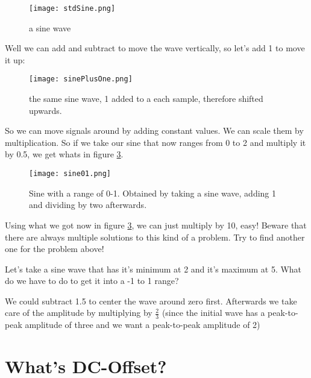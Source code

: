 \begin{figure}[h!]
	\centering
	\texttt{[image: stdSine.png]}
	\caption[a sine wave]
	{a sine wave}
	\label{fig:aSine}
\end{figure}
Well we can add and subtract to move the wave vertically, so let's add 1 to move it up:

\begin{figure}[h!]
	\centering
	\texttt{[image: sinePlusOne.png]}
	\caption[a sine wave]
	{the same sine wave, 1 added to a each sample, therefore shifted upwards.}
	\label{fig:aShiftedSine}
\end{figure}

So we can move signals around by adding constant values. We can scale them by multiplication. So if we take our sine that now ranges from 0 to 2 and multiply it by 0.5, we get whats in figure \ref{fig:sine01}.

\begin{figure}[h!]
 	\centering
 	\texttt{[image: sine01.png]}
 	\caption[sine 0 to 1]
 	{Sine with a range of 0-1. Obtained by taking a sine wave, adding 1 and dividing by two afterwards.}
 	\label{fig:sine01}
 \end{figure}

Using what we got now in figure \ref{fig:sine01}, we can just multiply by 10, easy! Beware that there are always multiple solutions to this kind of a problem. Try to find another one for the problem above!

\begin{question}
Let's take a sine wave that has it's minimum at 2 and it's maximum at 5. What do we have to do to get it into a -1 to 1 range?
\end{question}
\begin{Answer}
We could subtract 1.5 to center the wave around zero first. Afterwards we take care of the amplitude by multiplying by $\frac{2}{3}$ (since the initial wave has a peak-to-peak amplitude of three and we want a peak-to-peak amplitude of 2)
\end{Answer}



\section{What's DC-Offset?}

